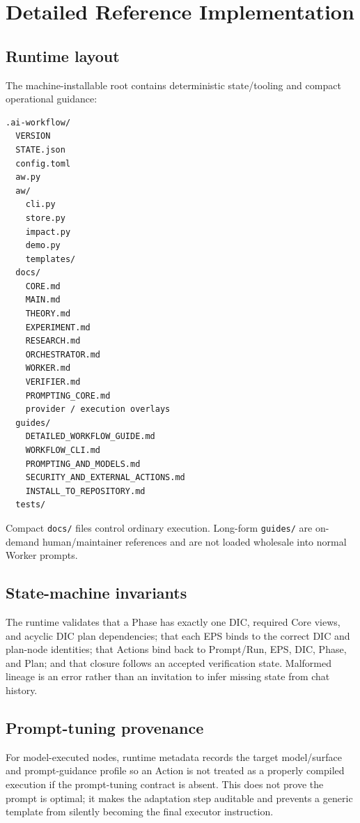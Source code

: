 \documentclass[11pt,a4paper]{article}
\begin{document}
\section{Detailed Reference Implementation}\label{sec:detailed-implementation}
\subsection{Runtime layout}
The machine-installable root contains deterministic state/tooling and compact operational guidance:
\begin{lstlisting}[style=workflow]
.ai-workflow/
  VERSION
  STATE.json
  config.toml
  aw.py
  aw/
    cli.py
    store.py
    impact.py
    demo.py
    templates/
  docs/
    CORE.md
    MAIN.md
    THEORY.md
    EXPERIMENT.md
    RESEARCH.md
    ORCHESTRATOR.md
    WORKER.md
    VERIFIER.md
    PROMPTING_CORE.md
    provider / execution overlays
  guides/
    DETAILED_WORKFLOW_GUIDE.md
    WORKFLOW_CLI.md
    PROMPTING_AND_MODELS.md
    SECURITY_AND_EXTERNAL_ACTIONS.md
    INSTALL_TO_REPOSITORY.md
  tests/
\end{lstlisting}
Compact \texttt{docs/} files control ordinary execution. Long-form \texttt{guides/} are on-demand human/maintainer references and are not loaded wholesale into normal Worker prompts.

\subsection{State-machine invariants}
The runtime validates that a Phase has exactly one DIC, required Core views, and acyclic DIC plan dependencies; that each EPS binds to the correct DIC and plan-node identities; that Actions bind back to Prompt/Run, EPS, DIC, Phase, and Plan; and that closure follows an accepted verification state. Malformed lineage is an error rather than an invitation to infer missing state from chat history.

\subsection{Prompt-tuning provenance}
For model-executed nodes, runtime metadata records the target model/surface and prompt-guidance profile so an Action is not treated as a properly compiled execution if the prompt-tuning contract is absent. This does not prove the prompt is optimal; it makes the adaptation step auditable and prevents a generic template from silently becoming the final executor instruction.
\end{document}
